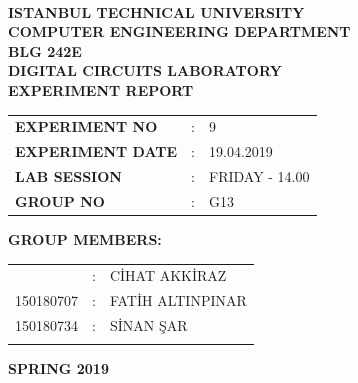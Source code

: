 \documentclass[pdftex,12pt,a4paper]{article}
\begin{document}
\begin{titlepage}
\begin{center}
\textbf{}\\
\textbf{\Large{ISTANBUL TECHNICAL UNIVERSITY}}\\
\vspace{0.5cm}
\textbf{\Large{COMPUTER ENGINEERING DEPARTMENT}}\\
\vspace{2cm}
\textbf{\Large{BLG 242E\\ DIGITAL CIRCUITS LABORATORY\\ EXPERIMENT REPORT}}\\
\vspace{2.8cm}
\begin{table}[ht]
\centering
\Large{
\begin{tabular}{lcl}
\textbf{EXPERIMENT NO}  & : & 9 \\
\textbf{EXPERIMENT DATE}  & : & 19.04.2019 \\
\textbf{LAB SESSION}  & : & FRIDAY - 14.00 \\
\textbf{GROUP NO}  & : & G13 \\
\end{tabular}}
\end{table}
\vspace{1cm}
\textbf{\Large{GROUP MEMBERS:}}\\
\begin{table}[ht]
\centering
\Large{
\begin{tabular}{rcl}
{
150180704  & : & C\.{I}HAT AKK\.{I}RAZ \\
150180707  & : & FAT\.{I}H ALTINPINAR \\
150180734  & : & S\.{I}NAN \c{S}AR \\
}
\end{tabular}}
\end{table}
\vspace{2.8cm}
\textbf{\Large{SPRING 2019}}

\end{center}

\end{titlepage}

\newpage
\newpage

\thispagestyle{empty}
\setcounter{tocdepth}{4}
\tableofcontents
\clearpage
\end{document}
